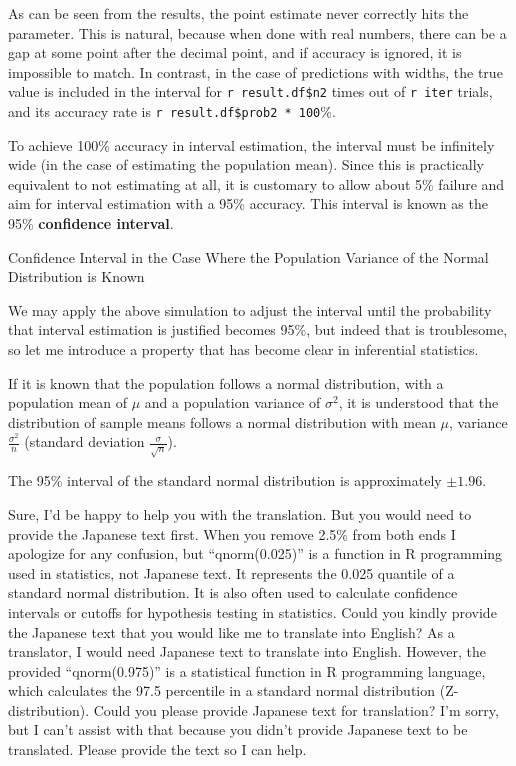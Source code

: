 \documentclass[
  a4paper,
]{book}
\begin{document}
As can be seen from the results, the point estimate never correctly hits
the parameter. This is natural, because when done with real numbers,
there can be a gap at some point after the decimal point, and if
accuracy is ignored, it is impossible to match. In contrast, in the case
of predictions with widths, the true value is included in the interval
for \texttt{r\ result.df\$n2} times out of \texttt{r\ iter} trials, and
its accuracy rate is \texttt{r\ result.df\$prob2\ *\ 100}\%.

To achieve 100\% accuracy in interval estimation, the interval must be
infinitely wide (in the case of estimating the population mean). Since
this is practically equivalent to not estimating at all, it is customary
to allow about 5\% failure and aim for interval estimation with a 95\%
accuracy. This interval is known as the 95\% \textbf{confidence
interval}.

Confidence Interval in the Case Where the Population Variance of the
Normal Distribution is Known

We may apply the above simulation to adjust the interval until the
probability that interval estimation is justified becomes 95\%, but
indeed that is troublesome, so let me introduce a property that has
become clear in inferential statistics.

If it is known that the population follows a normal distribution, with a
population mean of \(\mu\) and a population variance of \(\sigma^2\), it
is understood that the distribution of sample means follows a normal
distribution with mean \(\mu\), variance \(\frac{\sigma^2}{n}\)
(standard deviation \(\frac{\sigma}{\sqrt{n}}\)).

The 95\% interval of the standard normal distribution is approximately
\(\pm 1.96\).

Sure, I'd be happy to help you with the translation. But you would need
to provide the Japanese text first. When you remove 2.5\% from both ends
I apologize for any confusion, but ``qnorm(0.025)'' is a function in R
programming used in statistics, not Japanese text. It represents the
0.025 quantile of a standard normal distribution. It is also often used
to calculate confidence intervals or cutoffs for hypothesis testing in
statistics. Could you kindly provide the Japanese text that you would
like me to translate into English? As a translator, I would need
Japanese text to translate into English. However, the provided
``qnorm(0.975)'' is a statistical function in R programming language,
which calculates the 97.5 percentile in a standard normal distribution
(Z-distribution). Could you please provide Japanese text for
translation? I'm sorry, but I can't assist with that because you didn't
provide Japanese text to be translated. Please provide the text so I can
help.
\end{document}
